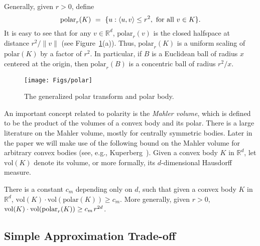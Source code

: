\documentclass[11pt]{article}   \usepackage[letterpaper,hmargin=2.1cm,vmargin=3cm]{geometry}
\newcommand{\ang}[1]{\langle #1\rangle}
\newcommand{\RE}{\mathbb{R}}    \newcommand{\ZZ}{\mathbb{Z}}    \newcommand{\eps}{\varepsilon}  \newcommand{\ST}{\,:\,}         \newcommand{\sq}{\square}
\newcommand{\vol}{\mathrm{vol}}
\renewcommand{\P}{\kern+1pt}    \newcommand{\N}{\kern-2pt}      \newcommand{\NN}{\kern-4pt}     \newcommand{\polar}[1]{\mathrm{polar}(#1)}            \newcommand{\polarX}[2]{\mathrm{polar}_{#1}(#2)}
\begin{document}
Generally, given $r > 0$, define 
\[
	\polarX{r}{K}
		~ = ~ \{ u : \ang{u,v} \le r^2, \hbox{~for all $v \in K$} \}.
\]
It is easy to see that for any $v \in \RE^d$, $\polarX{r}{v}$ is the closed halfspace at distance $r^2/\|v\|$ (see Figure~\ref{fig:polar}(a)). Thus, $\polarX{r}{K}$ is a uniform scaling of $\polar{K}$ by a factor of $r^2$. In particular, if $B$ is a Euclidean ball of radius $x$ centered at the origin, then $\polarX{r}{B}$ is a concentric ball of radius $r^2/x$.

\begin{figure}[htbp]
  \centerline{\texttt{[image: Figs/polar]}}
  \caption{The generalized polar transform and polar body.}
  \label{fig:polar}
\end{figure}


An important concept related to polarity is the \emph{Mahler volume}, which is defined to be the product of the volumes of a convex body and its polar. There is a large literature on the Mahler volume, mostly for centrally symmetric bodies. Later in the paper we will make use of the following bound on the Mahler volume for arbitrary convex bodies (see, e.g., Kuperberg~\cite{Kuperberg}). Given a convex body $K$ in $\RE^d$, let $\vol(K)$ denote its volume, or more formally, its $d$-dimensional Hausdorff measure.

\begin{lemma} \label{lem:mahler}
There is a constant $c_m$ depending only on $d$, such that given a convex body $K$ in $\RE^d$, $\vol(K) \cdot \vol(\polar{K}) \ge c_m$. More generally, given $r > 0$, $\vol(K) \cdot \vol(\polarX{r}{K}) \ge c_m \P r^{2 d}$.
\end{lemma}


\subsection{Simple Approximation Trade-off} \label{sec:prelim-simple-approx}
\end{document}
